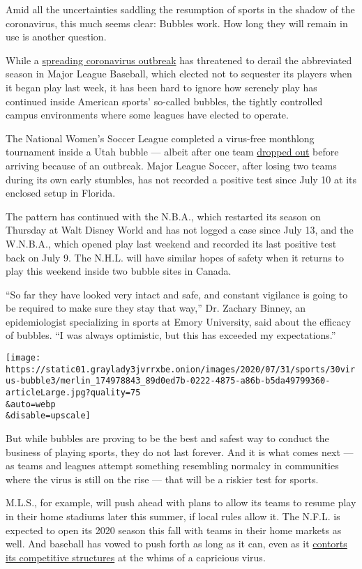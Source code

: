 Amid all the uncertainties saddling the resumption of sports in the
shadow of the coronavirus, this much seems clear: Bubbles work. How long
they will remain in use is another question.

While a
\href{https://twitter.com/Phillies/status/1288882323614846976?s=20}{spreading
coronavirus outbreak} has threatened to derail the abbreviated season in
Major League Baseball, which elected not to sequester its players when
it began play last week, it has been hard to ignore how serenely play
has continued inside American sports' so-called bubbles, the tightly
controlled campus environments where some leagues have elected to
operate.

The National Women's Soccer League completed a virus-free monthlong
tournament inside a Utah bubble --- albeit after one team
\href{https://www.nytimes3xbfgragh.onion/2020/06/22/sports/soccer/orlando-pride-nwsl-coronavirus.html}{dropped
out} before arriving because of an outbreak. Major League Soccer, after
losing two teams during its own early stumbles, has not recorded a
positive test since July 10 at its enclosed setup in Florida.

The pattern has continued with the N.B.A., which restarted its season on
Thursday at Walt Disney World and has not logged a case since July 13,
and the W.N.B.A., which opened play last weekend and recorded its last
positive test back on July 9. The N.H.L. will have similar hopes of
safety when it returns to play this weekend inside two bubble sites in
Canada.

``So far they have looked very intact and safe, and constant vigilance
is going to be required to make sure they stay that way,'' Dr. Zachary
Binney, an epidemiologist specializing in sports at Emory University,
said about the efficacy of bubbles. ``I was always optimistic, but this
has exceeded my expectations.''

\texttt{[image: https://static01.graylady3jvrrxbe.onion/images/2020/07/31/sports/30virus-bubble3/merlin\_174978843\_89d0ed7b-0222-4875-a86b-b5da49799360-articleLarge.jpg?quality=75\\\&auto=webp\\\&disable=upscale]}

But while bubbles are proving to be the best and safest way to conduct
the business of playing sports, they do not last forever. And it is what
comes next --- as teams and leagues attempt something resembling
normalcy in communities where the virus is still on the rise --- that
will be a riskier test for sports.

M.L.S., for example, will push ahead with plans to allow its teams to
resume play in their home stadiums later this summer, if local rules
allow it. The N.F.L. is expected to open its 2020 season this fall with
teams in their home markets as well. And baseball has vowed to push
forth as long as it can, even as it
\href{https://www.nytimes3xbfgragh.onion/2020/07/27/sports/baseball/coronavirus-yankees-marlins-phillies.html}{contorts
its competitive structures} at the whims of a capricious virus.

